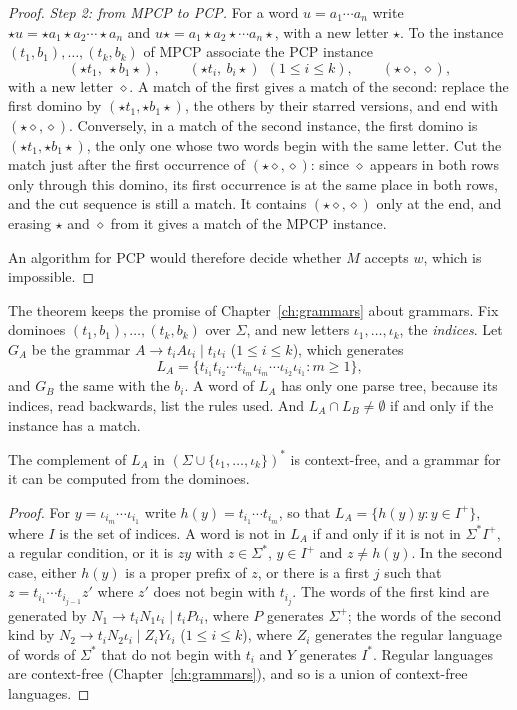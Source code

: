 \begin{proof}
\emph{Step 2: from MPCP to PCP.} For a word $u=a_1\cdots a_n$ write $\star u=\star a_1\star a_2\cdots\star a_n$ and $u\star=a_1\star a_2\star\cdots a_n\star$, with a new letter $\star$. To the instance $(t_1,b_1),\dots,(t_k,b_k)$ of MPCP associate the PCP instance
\[
(\star t_1,\ \star b_1\star),\qquad(\star t_i,\ b_i\star)\ \ (1\le i\le k),\qquad(\star\diamond,\ \diamond),
\]
with a new letter $\diamond$. A match of the first gives a match of the second: replace the first domino by $(\star t_1,\star b_1\star)$, the others by their starred versions, and end with $(\star\diamond,\diamond)$. Conversely, in a match of the second instance, the first domino is $(\star t_1,\star b_1\star)$, the only one whose two words begin with the same letter. Cut the match just after the first occurrence of $(\star\diamond,\diamond)$: since $\diamond$ appears in both rows only through this domino, its first occurrence is at the same place in both rows, and the cut sequence is still a match. It contains $(\star\diamond,\diamond)$ only at the end, and erasing $\star$ and $\diamond$ from it gives a match of the MPCP instance.

An algorithm for PCP would therefore decide whether $M$ accepts $w$, which is impossible.
\end{proof}

The theorem keeps the promise of Chapter~\ref{ch:grammars} about grammars. Fix dominoes $(t_1,b_1),\dots,(t_k,b_k)$ over $\Sigma$, and new letters $\iota_1,\dots,\iota_k$, the \emph{indices}. Let $G_A$ be the grammar $A\to t_iA\iota_i\mid t_i\iota_i$ ($1\le i\le k$), which generates
\[
L_A=\{t_{i_1}t_{i_2}\cdots t_{i_m}\iota_{i_m}\cdots\iota_{i_2}\iota_{i_1}:m\ge1\},
\]
and $G_B$ the same with the $b_i$. A word of $L_A$ has only one parse tree, because its indices, read backwards, list the rules used. And $L_A\cap L_B\ne\emptyset$ if and only if the instance has a match.

\begin{proposition}\label{prop:pcpcomplement}
The complement of $L_A$ in $(\Sigma\cup\{\iota_1,\dots,\iota_k\})^*$ is context-free, and a grammar for it can be computed from the dominoes.
\end{proposition}

\begin{proof}
For $y=\iota_{i_m}\cdots\iota_{i_1}$ write $h(y)=t_{i_1}\cdots t_{i_m}$, so that $L_A=\{h(y)y:y\in I^+\}$, where $I$ is the set of indices. A word is not in $L_A$ if and only if it is not in $\Sigma^*I^+$, a regular condition, or it is $zy$ with $z\in\Sigma^*$, $y\in I^+$ and $z\ne h(y)$. In the second case, either $h(y)$ is a proper prefix of $z$, or there is a first $j$ such that $z=t_{i_1}\cdots t_{i_{j-1}}z'$ where $z'$ does not begin with $t_{i_j}$. The words of the first kind are generated by $N_1\to t_iN_1\iota_i\mid t_iP\iota_i$, where $P$ generates $\Sigma^+$; the words of the second kind by $N_2\to t_iN_2\iota_i\mid Z_iY\iota_i$ ($1\le i\le k$), where $Z_i$ generates the regular language of words of $\Sigma^*$ that do not begin with $t_i$ and $Y$ generates $I^*$. Regular languages are context-free (Chapter~\ref{ch:grammars}), and so is a union of context-free languages.
\end{proof}

